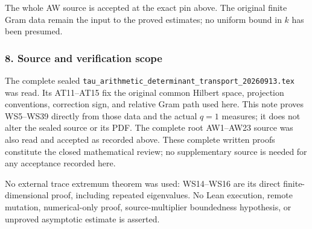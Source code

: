 \documentclass{article}
\begin{document}
The whole AW source is accepted at the exact pin above. The original finite Gram data remain the input to the proved estimates; no uniform bound in \(k\) has been presumed.

\subsubsection{8. Source and verification scope}\label{endpoint-window_review--source-and-verification-scope}

The complete sealed \nolinkurl{tau_arithmetic_determinant_transport_20260913.tex} was read. Its AT11--AT15 fix the original common Hilbert space, projection conventions, correction sign, and relative Gram path used here. This note proves WS5--WS39 directly from those data and the actual \(q=1\) measures; it does not alter the sealed source or its PDF. The complete root AW1--AW23 source was also read and accepted as recorded above. These complete written proofs constitute the closed mathematical review; no supplementary source is needed for any acceptance recorded here.

No external trace extremum theorem was used: WS14--WS16 are its direct finite-dimensional proof, including repeated eigenvalues. No Lean execution, remote mutation, numerical-only proof, source-multiplier boundedness hypothesis, or unproved asymptotic estimate is asserted.

\endgroup
\end{document}
